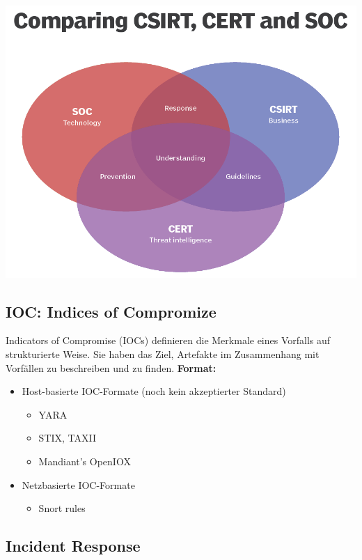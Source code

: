 \begin{center}
    \vspace{-8pt}
    \includegraphics[width=0.8\linewidth]{./img/02-begriffe/soc_cert_csirt}
    \vspace{-8pt}
\end{center}

\subsection{IOC: Indices of Compromize}
Indicators of Compromise (IOCs) definieren die Merkmale eines Vorfalls auf strukturierte Weise. Sie haben das Ziel, Artefakte im Zusammenhang mit Vorfällen zu beschreiben und zu finden.
\textbf{Format:}
\begin{itemize}
    \item Host-basierte IOC-Formate (noch kein akzeptierter Standard)
    \begin{itemize}
        \item YARA
        \item STIX, TAXII
        \item Mandiant's OpenIOX
    \end{itemize}
    \item Netzbasierte IOC-Formate
    \begin{itemize}
        \item Snort rules
    \end{itemize}
\end{itemize}

\subsection{Incident Response}

